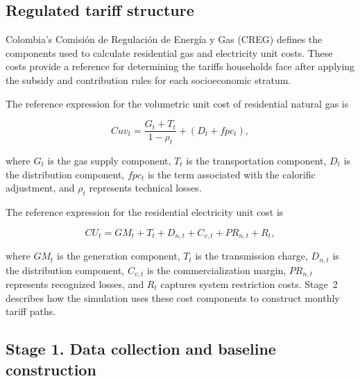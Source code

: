 \documentclass[authoryear,preprint,review,10pt]{elsarticle}
\begin{document}
\subsection{Regulated tariff structure}
\label{sec:regulated_tariffs}

Colombia's Comisión de Regulación de Energía y Gas (CREG) defines the components used to calculate residential gas and electricity unit costs. These costs provide a reference for determining the tariffs households face after applying the subsidy and contribution rules for each socioeconomic stratum.

The reference expression for the volumetric unit cost of residential natural gas is

\begin{equation}
Cuv_t = \frac{G_t + T_t}{1-\rho_t} + \left(D_t + fpc_t\right),
\label{eq:gas_tariff_method}
\end{equation}
 \citep{CREG137_2013,CREG183_2013,CREG184_2014}

where $G_t$ is the gas supply component, $T_t$ is the transportation component, $D_t$ is the distribution component, $fpc_t$ is the term associated with the calorific adjustment, and $\rho_t$ represents technical losses.

The reference expression for the residential electricity unit cost is


\begin{equation}
CU_t = GM_t + T_t + D_{n,t} + C_{v,t} + PR_{n,t} + R_t,
\label{eq:elec_tariff_method}
\end{equation}
\citep{CREG119_2007}

where $GM_t$ is the generation component, $T_t$ is the transmission charge, $D_{n,t}$ is the distribution component, $C_{v,t}$ is the commercialization margin, $PR_{n,t}$ represents recognized losses, and $R_t$ captures system restriction costs. Stage~2 describes how the simulation uses these cost components to construct monthly tariff paths.

\subsection{Stage 1. Data collection and baseline construction}
\label{sec:data_collection}
\end{document}

